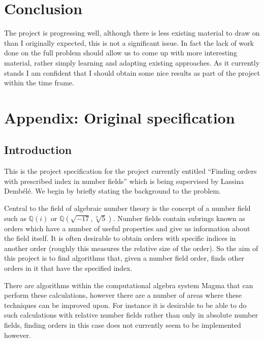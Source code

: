 \documentclass[11pt,a4paper]{article}
\begin{document}
\section*{Conclusion}
The project is progressing well, although there is less existing material to draw on than I originally expected, this is not a significant issue.
In fact the lack of work done on the full problem should allow us to come up with more interesting material, rather simply learning and adapting existing approaches.
As it currently stands I am confident that I should obtain some nice results as part of the project within the time frame.

%

\section*{Appendix: Original specification}
\subsection*{Introduction}
This is the project specification for the project currently entitled ``Finding 
orders with prescribed index in number fields'' which is being supervised by 
Lassina Demb\'el\'e. We begin by briefly stating the background to the problem.


Central to the field of algebraic number theory is the concept of a number 
field such as $\mathbb{Q}(i)$ or $\mathbb{Q}(\sqrt{-17},\sqrt[3]{5})$.
Number fields contain subrings known as orders which have a number of useful
properties and give us information about the field itself.
It is often desirable to obtain orders with specific indices in another order
(roughly this measures the relative size of the order).
So the aim of this project is to find algorithms that, given a number field
order, finds other orders in it that have the specified index.


There are algorithms within the computational algebra system Magma that can 
perform these calculations, however there are a number of areas where these 
techniques can be improved upon.
For instance it is desirable to be able to do such calculations with relative
number fields rather than only in absolute number fields, finding orders in
this case does not currently seem to be implemented however.
\end{document}
